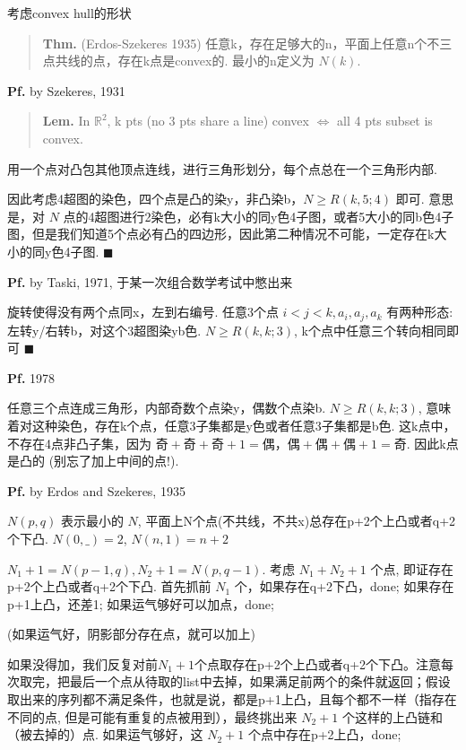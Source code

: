 考虑convex hull的形状

\begin{quotation}
\textbf{Thm.} (Erdos-Szekeres 1935) 任意k，存在足够大的n，平面上任意n个不三点共线的点，存在k点是convex的. 最小的n定义为 $N(k)$.
\end{quotation}

\textbf{Pf.} by Szekeres, 1931

\begin{quotation}
\textbf{Lem.} In $\mathbb{R}^2$, k pts (no 3 pts share a line) convex $\iff$ all 4 pts subset is convex.
\end{quotation}

用一个点对凸包其他顶点连线，进行三角形划分，每个点总在一个三角形内部.

因此考虑4超图的染色，四个点是凸的染y，非凸染b，$N\geq R(k,5;4)$ 即可. 意思是，对 $N$ 点的4超图进行2染色，必有k大小的同y色4子图，或者5大小的同b色4子图，但是我们知道5个点必有凸的四边形，因此第二种情况不可能，一定存在k大小的同y色4子图. $\blacksquare$

\textbf{Pf.} by Taski, 1971, 于某一次组合数学考试中憋出来

旋转使得没有两个点同x，左到右编号. 任意3个点 $i<j<k,a_i,a_j,a_k$ 有两种形态: 左转y/右转b，对这个3超图染yb色. $N\geq R(k,k;3)$, k个点中任意三个转向相同即可 $\blacksquare$

\textbf{Pf.} 1978

任意三个点连成三角形，内部奇数个点染y，偶数个点染b. $N\geq R(k,k;3)$, 意味着对这种染色，存在k个点，任意3子集都是y色或者任意3子集都是b色. 这k点中，不存在4点非凸子集，因为 $\text{奇}+\text{奇}+\text{奇}+1=\text{偶}$，$\text{偶}+\text{偶}+\text{偶}+1=\text{奇}$. 因此k点是凸的 (别忘了加上中间的点!).

\textbf{Pf.} by Erdos and Szekeres, 1935


$N(p,q)$ 表示最小的 $N$, 平面上N个点(不共线，不共x)总存在p+2个上凸或者q+2个下凸. $N(0,\_)=2$, $N(n,1)=n+2$

$N_1+1=N(p-1,q),N_2+1=N(p,q-1)$. 考虑 $N_1+N_2+1$ 个点, 即证存在p+2个上凸或者q+2个下凸. 首先抓前 $N_1$ 个，如果存在q+2下凸，done; 如果存在p+1上凸，还差1; 如果运气够好可以加点，done;

(如果运气好，阴影部分存在点，就可以加上)


如果没得加，我们反复对前$N_1+1$个点取存在p+2个上凸或者q+2个下凸。注意每次取完，把最后一个点从待取的list中去掉，如果满足前两个的条件就返回；假设取出来的序列都不满足条件，也就是说，都是p+1上凸，且每个都不一样（指存在不同的点, 但是可能有重复的点被用到），最终挑出来 $N_2+1$ 个这样的上凸链和（被去掉的）点. 如果运气够好，这 $N_2+1$ 个点中存在p+2上凸，done;


